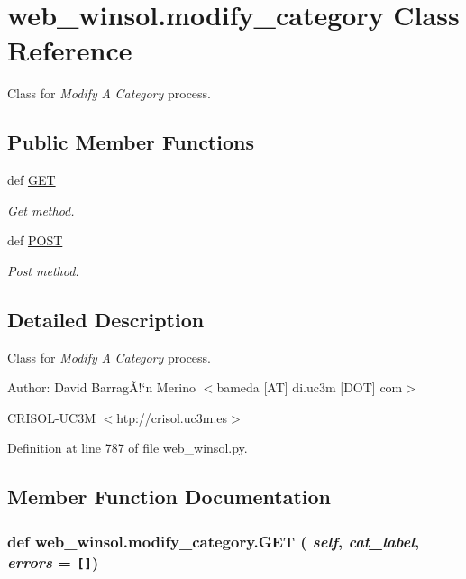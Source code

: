 \hypertarget{classweb__winsol_1_1modify__category}{
\section{web\_\-winsol.modify\_\-category Class Reference}
\label{classweb__winsol_1_1modify__category}
}
Class for {\em Modify\/} {\em A\/} {\em Category\/} process.  


\subsection*{Public Member Functions}
\begin{CompactItemize}
\item 
def \hyperlink{classweb__winsol_1_1modify__category_6e4964487af3566ee8074ab3991fbafa}{GET}
\begin{CompactList}\small\item\em Get method. \item\end{CompactList}\item 
def \hyperlink{classweb__winsol_1_1modify__category_aca67c7ee533f669aac3258ec9f3eb5a}{POST}
\begin{CompactList}\small\item\em Post method. \item\end{CompactList}\end{CompactItemize}


\subsection{Detailed Description}
Class for {\em Modify\/} {\em A\/} {\em Category\/} process. 

\begin{Desc}
\item[Author:]David Barrag\~{A}!`n Merino $<$bameda \mbox{[}AT\mbox{]} di.uc3m \mbox{[}DOT\mbox{]} com$>$ 

CRISOL-UC3M $<$htp://crisol.uc3m.es$>$ \end{Desc}




Definition at line 787 of file web\_\-winsol.py.

\subsection{Member Function Documentation}
\hypertarget{classweb__winsol_1_1modify__category_6e4964487af3566ee8074ab3991fbafa}{
\subsubsection[GET]{\setlength{\rightskip}{0pt plus 5cm}def web\_\-winsol.modify\_\-category.GET ( {\em self},  {\em cat\_\-label},  {\em errors} = {\tt \mbox{[}\mbox{]}})}}
\label{classweb__winsol_1_1modify__category_6e4964487af3566ee8074ab3991fbafa}


